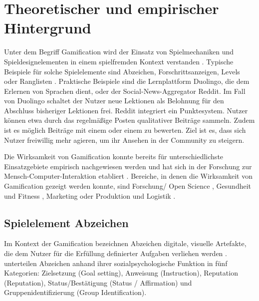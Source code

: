 \section{Theoretischer und empirischer Hintergrund}

Unter dem Begriff Gamification wird der Einsatz von Spielmechaniken und Spieldesignelementen in einem spielfremden Kontext verstanden \cite{deterding_game_2011}. Typische Beispiele für solche Spielelemente sind Abzeichen, Forschrittsanzeigen, Levels oder Ranglisten \cite{koch2013gamification}. Praktische Beispiele sind die Lernplattform Duolingo, die dem Erlernen von Sprachen dient, oder der Social-News-Aggregator Reddit. Im Fall von Duolingo schaltet der Nutzer neue Lektionen als Belohnung für den Abschluss bisheriger Lektionen frei. Reddit integriert ein Punktesystem. Nutzer können etwa durch das regelmäßige Posten qualitativer Beiträge  sammeln. Zudem ist es möglich Beiträge mit einem  oder einem  zu bewerten.
Ziel ist es, dass sich Nutzer freiwillig mehr agieren, um ihr Ansehen in der Community zu steigern.

Die Wirksamkeit von Gamification konnte bereits für unterschiedlichste Einsatzgebiete empirisch nachgewiesen werden \cite{koivisto_rise_2019} und hat sich in der Forschung zur Mensch-Computer-Interaktion etabliert \cite{huotari_defining_2012}. 
Bereiche, in denen die Wirksamkeit von Gamification gezeigt werden konnte, sind Forschung/ Open Science \cite{brauer_erhohung_2019,kidwell_badges_2016}, Gesundheit und Fitness \cite{johnson_gamification_2016}, Marketing \cite{huotari_defining_2012} oder Produktion und Logistik \cite{warmelink_gamification_2018}.

\subsection{Spielelement Abzeichen}
Im Kontext der Gamification bezeichnen Abzeichen digitale, visuelle Artefakte, die dem Nutzer für die Erfüllung definierter Aufgaben verliehen werden \cite{antin_badges_2011}. \citeauthor{antin_badges_2011} unterteilen Abzeichen anhand ihrer sozialpsychologische Funktion in fünf Kategorien: Zielsetzung (Goal setting), Anweisung (Instruction), Reputation (Reputation),
Status/Bestätigung (Status / Affirmation) und Gruppenidentifizierung (Group Identification). 

